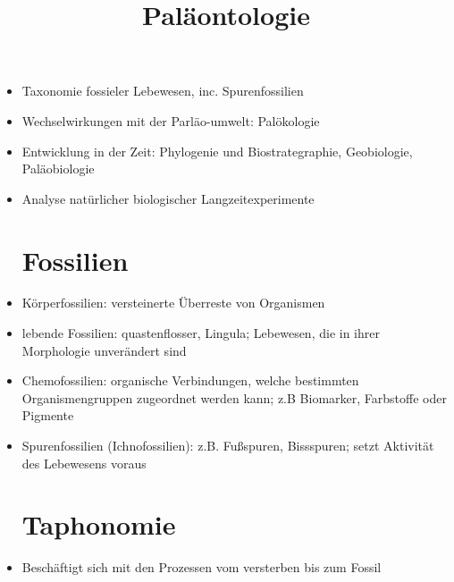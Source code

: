 \documentclass[a4paper,12pt]{scrartcl}
\begin{document}
\title{Paläontologie}
\maketitle



\begin{itemize}



\section{Aufgabenbereich} \label{sec:Aufgabenbereich}
\item Taxonomie fossieler Lebewesen, inc. Spurenfossilien 
\item Wechselwirkungen mit der Parläo-umwelt: Palökologie
\item Entwicklung in der Zeit: Phylogenie und Biostrategraphie, Geobiologie, Paläobiologie
\item Analyse natürlicher biologischer Langzeitexperimente



\section{Fossilien} \label{sec:Fossilien}

\item Körperfossilien: versteinerte Überreste von Organismen
\item lebende Fossilien: quastenflosser, Lingula; Lebewesen, die in ihrer Morphologie unverändert sind
\item Chemofossilien: organische Verbindungen, welche bestimmten Organismengruppen zugeordnet werden kann; z.B Biomarker, Farbstoffe oder Pigmente
\item Spurenfossilien (Ichnofossilien): z.B. Fußspuren, Bissspuren; setzt Aktivität des Lebewesens voraus

\newpage

\section{Taphonomie} \label{sec:Taphonomie}

\item Beschäftigt sich mit den Prozessen vom versterben bis zum Fossil



\end{itemize}
\end{document}
